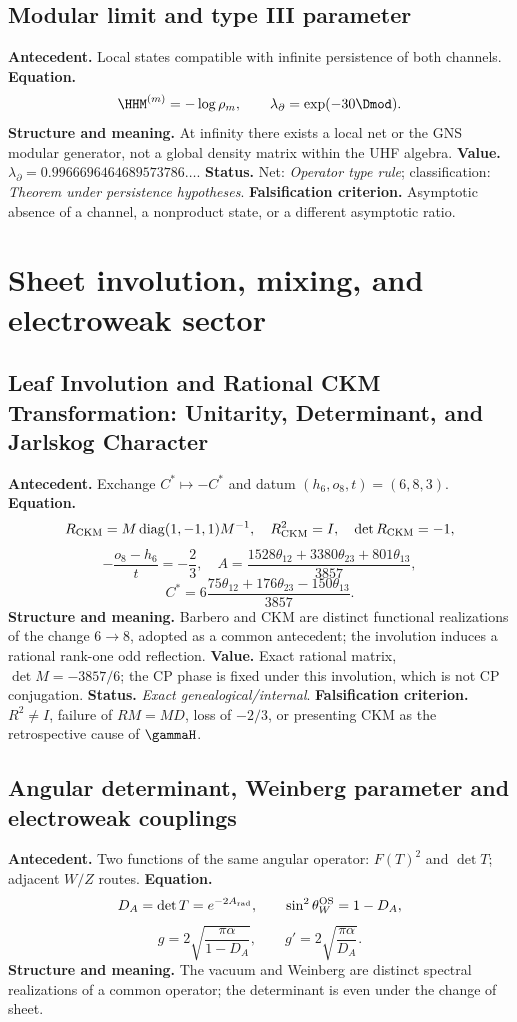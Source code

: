 \subsection*{Modular limit and type III parameter }
\textbf{Antecedent.} Local states compatible with infinite persistence of
both channels. \textbf{Equation.}
\[
\HHM^{(m)}=-\log\rho_m,
\qquad
\lambda_\partial=\exp(-30\Dmod).
\]
\textbf{Structure and meaning.} At infinity there exists a local net or the
GNS modular generator, not a global density matrix within the UHF algebra.
\textbf{Value.}
\(\lambda_\partial=0.9966696464689573786\ldots\).
\textbf{Status.} Net: \emph{Operator type rule}; classification:
\emph{Theorem under persistence hypotheses}. \textbf{Falsification criterion.} Asymptotic absence
of a channel, a nonproduct state, or a different asymptotic ratio.

\section{Sheet involution, mixing, and electroweak sector}

\subsection*{Leaf Involution and Rational CKM Transformation: Unitarity, Determinant, and Jarlskog Character}
\textbf{Antecedent.} Exchange \(C^*\mapsto-C^*\) and datum
\((h_6,o_8,t)=(6,8,3)\). \textbf{Equation.}
\[
R_{\rm CKM}=M\operatorname{diag}(1,-1,1)M^{-1},
\quad R_{\rm CKM}^2=I,\quad\det R_{\rm CKM}=-1,
\]
\[
-\frac{o_8-h_6}{t}=-\frac23,
\quad
A=\frac{1528\theta_{12}+3380\theta_{23}+801\theta_{13}}{3857},
\]
\[
C^*=6\frac{75\theta_{12}+176\theta_{23}-150\theta_{13}}{3857}.
\]
\textbf{Structure and meaning.} Barbero and CKM are distinct
functional realizations of the change \(6\to8\), adopted as a common antecedent; the involution induces a rational rank-one odd reflection.
\textbf{Value.} Exact rational matrix, \(\det M=-3857/6\); the CP phase
is fixed under this involution, which is not CP conjugation.
\textbf{Status.} \emph{Exact genealogical/internal}.
\textbf{Falsification criterion.} \(R^2\ne I\), failure of \(RM=MD\), loss of
\(-2/3\), or presenting CKM as the retrospective cause of \(\gammaH\).

\subsection*{Angular determinant, Weinberg parameter and electroweak couplings}
\textbf{Antecedent.} Two functions of the same angular operator:
\(F(T)^2\) and \(\det T\); adjacent \(W/Z\) routes.
\textbf{Equation.}
\[
D_A=\det T=e^{-2A_{\rm rad}},
\qquad \sin^2\theta_W^{\rm OS}=1-D_A,
\]
\[
g=2\sqrt{\frac{\pi\alpha}{1-D_A}},
\qquad g'=2\sqrt{\frac{\pi\alpha}{D_A}}.
\]
\textbf{Structure and meaning.} The vacuum and Weinberg are distinct
spectral realizations of a common operator; the determinant is even under the
change of sheet.

